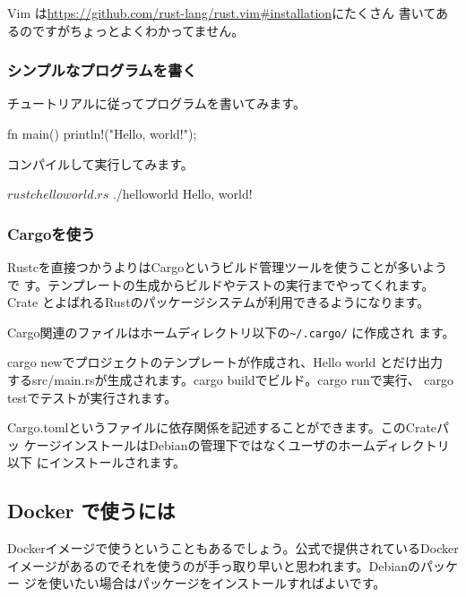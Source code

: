 \documentclass[mingoth,a4paper]{jsarticle}
\begin{document}
Vim は\url{https://github.com/rust-lang/rust.vim#installation}にたくさん
書いてあるのですがちょっとよくわかってません。

\subsubsection{シンプルなプログラムを書く}

チュートリアルに従ってプログラムを書いてみます。

\begin{commandline}
fn main() {
   println!("Hello, world!");
}
\end{commandline}

コンパイルして実行してみます。

\begin{commandline}
$ rustc helloworld.rs 
$ ./helloworld
Hello, world! 
\end{commandline}

\subsubsection{Cargoを使う}

Rustcを直接つかうよりはCargoというビルド管理ツールを使うことが多いようで
す。テンプレートの生成からビルドやテストの実行までやってくれます。Crate
とよばれるRustのパッケージシステムが利用できるようになります。

Cargo関連のファイルはホームディレクトリ以下の\verb!~/.cargo/! に作成され
ます。

cargo newでプロジェクトのテンプレートが作成され、Hello world とだけ出力
するsrc/main.rsが生成されます。cargo buildでビルド。cargo runで実行、
cargo testでテストが実行されます。


Cargo.tomlというファイルに依存関係を記述することができます。このCrateパッ
ケージインストールはDebianの管理下ではなくユーザのホームディレクトリ以下
にインストールされます。

\subsection{Docker で使うには}

Dockerイメージで使うということもあるでしょう。公式で提供されているDocker
イメージがあるのでそれを使うのが手っ取り早いと思われます。Debianのパッケー
ジを使いたい場合はパッケージをインストールすればよいです。
\end{document}
